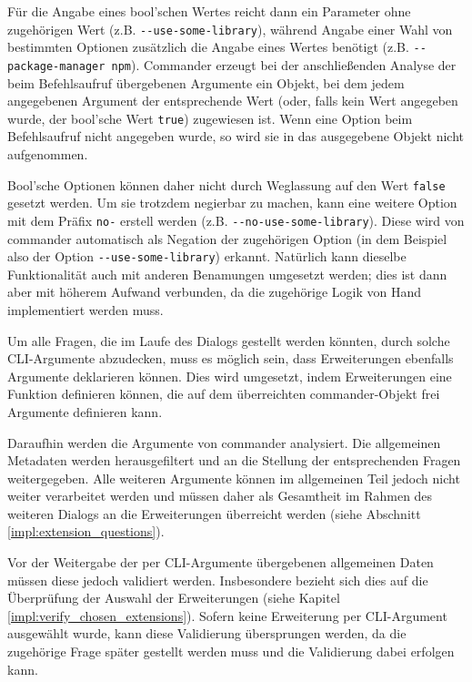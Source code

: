 Für die Angabe eines bool'schen Wertes reicht dann ein Parameter ohne zugehörigen Wert (z.B. \verb|--use-some-library|), während Angabe einer Wahl von bestimmten Optionen zusätzlich die Angabe eines Wertes benötigt (z.B. \verb|--package-manager npm|). Commander erzeugt bei der anschließenden Analyse der beim Befehlsaufruf übergebenen Argumente ein Objekt, bei dem jedem angegebenen Argument der entsprechende Wert (oder, falls kein Wert angegeben wurde, der bool'sche Wert \verb|true|) zugewiesen ist. Wenn eine Option beim Befehlsaufruf nicht angegeben wurde, so wird sie in das ausgegebene Objekt nicht aufgenommen.

Bool'sche Optionen können daher nicht durch Weglassung auf den Wert \verb|false| gesetzt werden. Um sie trotzdem negierbar zu machen, kann eine weitere Option mit dem Präfix \verb|no-| erstell werden (z.B. \verb|--no-use-some-library|). Diese wird von commander automatisch als Negation der zugehörigen Option (in dem Beispiel also der Option \verb|--use-some-library|) erkannt. Natürlich kann dieselbe Funktionalität auch mit anderen Benamungen umgesetzt werden; dies ist dann aber mit höherem Aufwand verbunden, da die zugehörige Logik von Hand implementiert werden muss.

Um alle Fragen, die im Laufe des Dialogs gestellt werden könnten, durch solche \gls{CLI}-Argumente abzudecken, muss es möglich sein, dass Erweiterungen ebenfalls Argumente deklarieren können. Dies wird umgesetzt, indem Erweiterungen eine Funktion definieren können, die auf dem überreichten commander-Objekt frei Argumente definieren kann.

Daraufhin werden die Argumente von commander analysiert. Die allgemeinen Metadaten werden herausgefiltert und an die Stellung der entsprechenden Fragen weitergegeben. Alle weiteren Argumente können im allgemeinen Teil jedoch nicht weiter verarbeitet werden und müssen daher als Gesamtheit im Rahmen des weiteren Dialogs an die Erweiterungen überreicht werden (siehe Abschnitt \ref{impl:extension_questions}).

Vor der Weitergabe der per \gls{CLI}-Argumente übergebenen allgemeinen Daten müssen diese jedoch validiert werden. Insbesondere bezieht sich dies auf die Überprüfung der Auswahl der Erweiterungen (siehe Kapitel \ref{impl:verify_chosen_extensions}). Sofern keine Erweiterung per \gls{CLI}-Argument ausgewählt wurde, kann diese Validierung übersprungen werden, da die zugehörige Frage später gestellt werden muss und die Validierung dabei erfolgen kann.

